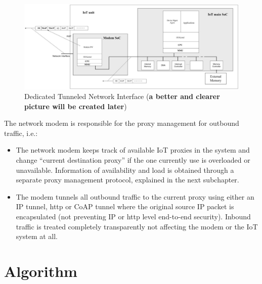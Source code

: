 \documentclass[sigplan,screen]{acmart}
\begin{document}
\begin{figure}[htbp]
\centerline{\includegraphics[scale=0.17]{pic/iot.png}}
\caption{Dedicated Tunneled Network Interface (\textbf{a better and clearer picture will be created later})}
\label{iot_network}
\end{figure}

The network modem is responsible for the proxy management for outbound traffic, i.e.:
\begin{itemize}
\item The network modem keeps track of available IoT proxies in the system and change “current destination proxy” if the one currently use is overloaded or unavailable. Information of availability and load is obtained through a separate proxy management protocol, explained in the next subchapter. 
\item The modem tunnels all outbound traffic to the current proxy using either an IP tunnel, http or CoAP tunnel where the original source IP packet is encapsulated (not preventing IP or http level end-to-end security). Inbound traffic is treated completely transparently not affecting the modem or the IoT system at all.
\end{itemize}

\section{Algorithm}
\end{document}
